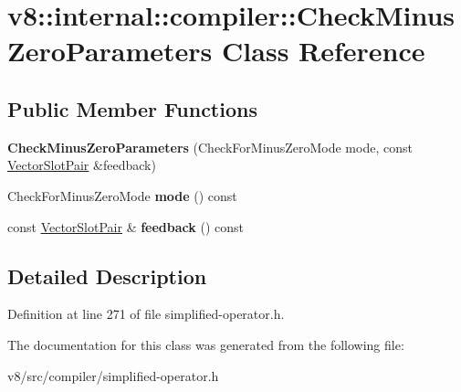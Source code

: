 \hypertarget{classv8_1_1internal_1_1compiler_1_1CheckMinusZeroParameters}{}\section{v8\+:\+:internal\+:\+:compiler\+:\+:Check\+Minus\+Zero\+Parameters Class Reference}
\label{classv8_1_1internal_1_1compiler_1_1CheckMinusZeroParameters}
\subsection*{Public Member Functions}
\begin{DoxyCompactItemize}
\item 
\mbox{\label{classv8_1_1internal_1_1compiler_1_1CheckMinusZeroParameters_a6059e6ebadd2d28c61f4ff26538c2c17}} 
{\bfseries Check\+Minus\+Zero\+Parameters} (Check\+For\+Minus\+Zero\+Mode mode, const \mbox{\hyperlink{classv8_1_1internal_1_1VectorSlotPair}{Vector\+Slot\+Pair}} \&feedback)
\item 
\mbox{\label{classv8_1_1internal_1_1compiler_1_1CheckMinusZeroParameters_ad15ecd69cef604cdf52b623ed4a23803}} 
Check\+For\+Minus\+Zero\+Mode {\bfseries mode} () const
\item 
\mbox{\label{classv8_1_1internal_1_1compiler_1_1CheckMinusZeroParameters_a18f05d1e5bcc899ac4041f7763d19219}} 
const \mbox{\hyperlink{classv8_1_1internal_1_1VectorSlotPair}{Vector\+Slot\+Pair}} \& {\bfseries feedback} () const
\end{DoxyCompactItemize}


\subsection{Detailed Description}


Definition at line 271 of file simplified-\/operator.\+h.



The documentation for this class was generated from the following file\+:\begin{DoxyCompactItemize}
\item 
v8/src/compiler/simplified-\/operator.\+h\end{DoxyCompactItemize}
